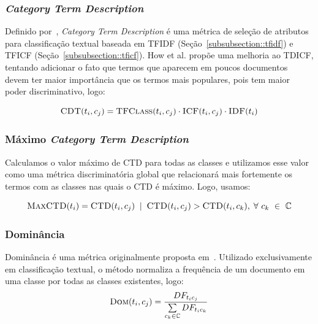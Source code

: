 \subsubsection{\textit{Category Term Description}}
\label{subsubsection::ctd}

Definido por~\cite{ChihHow04}, \textit{Category Term Description} é uma métrica de seleção de atributos para classificação textual baseada em \textsc{TFIDF} (Seção~\ref{subsubsection::tfidf}) e \textsc{TFICF} (Seção~\ref{subsubsection::tficf}). How et al. propõe uma melhoria ao TDICF, tentando adicionar o fato que termos que aparecem em poucos documentos devem ter maior importância que os termos mais populares, pois tem maior poder discriminativo, logo:

\begin{equation}\label{eqn::cdt}
 \textsc{CDT}(t_i, c_j) = \textsc{TFClass}(t_i, c_j) \cdot \textsc{ICF}(t_i, c_j) \cdot \textsc{IDF}(t_i)
\end{equation}

\subsubsection{Máximo \textit{Category Term Description}}
\label{subsubsection::maxctd}
Calculamos o valor máximo de \textsc{CTD} para todas as classes e utilizamos esse valor como uma métrica discriminatória global que relacionará mais fortemente os termos com as classes nas quais o \textsc{CTD} é máximo. Logo, usamos:

\begin{equation}\label{eqn::maxdom}
 \textsc{MaxCTD}(t_i) = \textsc{CTD}(t_i,c_j) \; \; | \;\; \textsc{CTD}(t_i, c_j) > \textsc{CTD}(t_i, c_k), \; \forall\ c_k\ \in\ \mathbb{C}
\end{equation}

\subsubsection{Dominância}
\label{subsubsection::dom}

Dominância é uma métrica originalmente proposta em~\cite{Zaiane02}.
Utilizado exclusivamente em classificação textual, o método normaliza a frequência de um documento em uma classe por todas as classes existentes, logo:
\begin{equation}\label{eqn::dom}
 \textsc{Dom}(t_i, c_j) = \frac{ DF_{t_ic_j} } { \sum\limits_{c_k \in \mathbb{C}} DF_{t_ic_k} } 
\end{equation}

